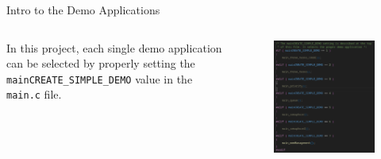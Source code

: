 \documentclass{beamer}
\begin{document}
\begin{frame}{Intro to the Demo Applications}

\vfill %
\centering
\begin{columns}[c] %
    \begin{column}{0.5\textwidth}
        In this project, each single demo application can be selected by properly setting the \texttt{mainCREATE\_SIMPLE\_DEMO} value in the \texttt{main.c} file.
    \end{column}

    \begin{column}{0.4\textwidth}
        \begin{figure}
            \centering
            \includegraphics[width=\linewidth]{img/mainCREATE_SIMPLE_DEMO.png}
            \label{fig:mainCREATE_SIMPLE_DEMO}
        \end{figure}
    \end{column}
\end{columns}

\end{frame}
\end{document}
